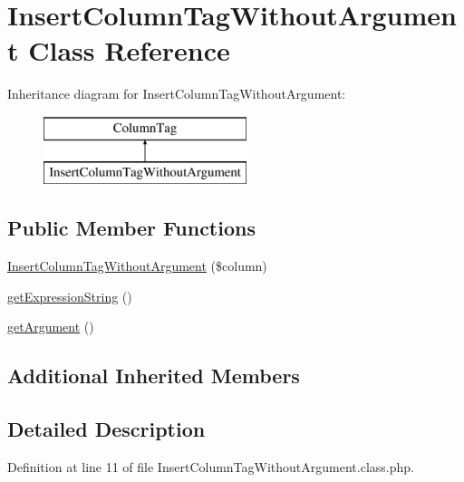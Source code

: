 \hypertarget{classInsertColumnTagWithoutArgument}{\section{Insert\+Column\+Tag\+Without\+Argument Class Reference}
\label{classInsertColumnTagWithoutArgument}
}
Inheritance diagram for Insert\+Column\+Tag\+Without\+Argument\+:\begin{figure}[H]
\begin{center}
\leavevmode
\includegraphics[height=2.000000cm]{classInsertColumnTagWithoutArgument}
\end{center}
\end{figure}
\subsection*{Public Member Functions}
\begin{DoxyCompactItemize}
\item 
\hyperlink{classInsertColumnTagWithoutArgument_ae1e10363dd8d24dff6cd05ca7711e455}{Insert\+Column\+Tag\+Without\+Argument} (\$column)
\item 
\hyperlink{classInsertColumnTagWithoutArgument_a0ea3febe1aed5e5f0fd8ac97fb0a8ac6}{get\+Expression\+String} ()
\item 
\hyperlink{classInsertColumnTagWithoutArgument_a728f587b2a45ff2b56c1f883197a3c4c}{get\+Argument} ()
\end{DoxyCompactItemize}
\subsection*{Additional Inherited Members}


\subsection{Detailed Description}


Definition at line 11 of file Insert\+Column\+Tag\+Without\+Argument.\+class.\+php.




